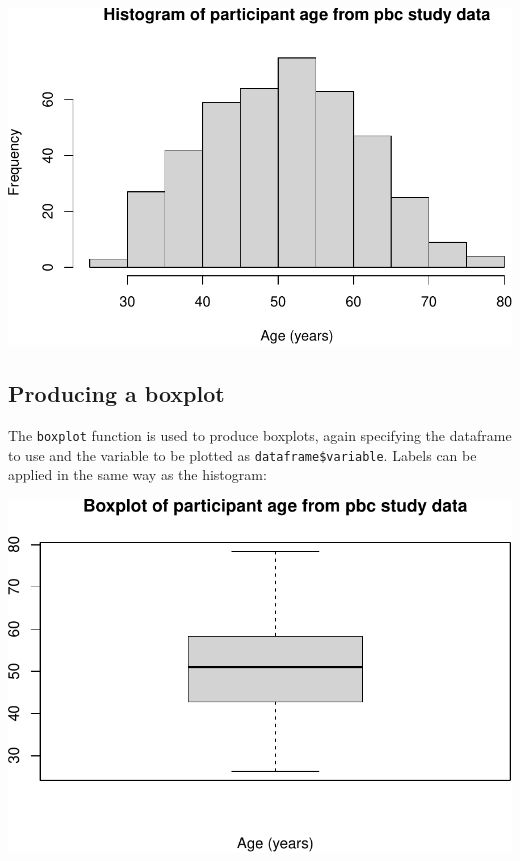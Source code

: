 \documentclass[
]{memoir}
\newenvironment{Shaded}{\begin{snugshade}}{\end{snugshade}}
\newcommand{\AttributeTok}[1]{\textcolor[rgb]{0.77,0.63,0.00}{#1}}
\newcommand{\FunctionTok}[1]{\textcolor[rgb]{0.00,0.00,0.00}{#1}}
\newcommand{\NormalTok}[1]{#1}
\newcommand{\SpecialCharTok}[1]{\textcolor[rgb]{0.00,0.00,0.00}{#1}}
\newcommand{\StringTok}[1]{\textcolor[rgb]{0.31,0.60,0.02}{#1}}
\begin{document}
\includegraphics{phcm9795-R-notes_files/figure-latex/unnamed-chunk-29-1.pdf}

\hypertarget{producing-a-boxplot}{%
\subsection{Producing a boxplot}\label{producing-a-boxplot}}

The \texttt{boxplot} function is used to produce boxplots, again specifying the dataframe to use and the variable to be plotted as \texttt{dataframe\$variable}. Labels can be applied in the same way as the histogram:

\begin{Shaded}
\end{Shaded}

\includegraphics{phcm9795-R-notes_files/figure-latex/unnamed-chunk-30-1.pdf}
\end{document}
